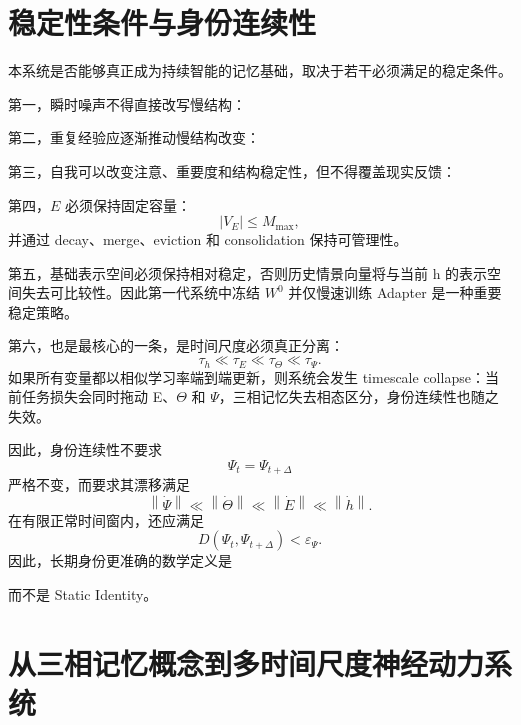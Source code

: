 \section{稳定性条件与身份连续性}

本系统是否能够真正成为持续智能的记忆基础，取决于若干必须满足的稳定条件。

第一，瞬时噪声不得直接改写慢结构：
\begin{statementbox}
\centering
{}
\end{statementbox}

第二，重复经验应逐渐推动慢结构改变：
\begin{statementbox}
\centering
{}
\end{statementbox}

第三，自我可以改变注意、重要度和结构稳定性，但不得覆盖现实反馈：
\begin{statementbox}
\centering
{}
\end{statementbox}

第四，$E$ 必须保持固定容量：
\[
\boxed{
|V_E|
\leq
M_{\max},
}
\]
并通过 decay、merge、eviction 和 consolidation 保持可管理性。

第五，基础表示空间必须保持相对稳定，否则历史情景向量将与当前 h 的表示空间失去可比较性。因此第一代系统中冻结 $W^0$ 并仅慢速训练 Adapter 是一种重要稳定策略。

第六，也是最核心的一条，是时间尺度必须真正分离：
\[
\boxed{
\tau_h
\ll
\tau_E
\ll
\tau_\Theta
\ll
\tau_\Psi.
}
\]
如果所有变量都以相似学习率端到端更新，则系统会发生 timescale collapse：当前任务损失会同时拖动 E、$\Theta$ 和 $\Psi$，三相记忆失去相态区分，身份连续性也随之失效。

因此，身份连续性不要求
\[
\Psi_t
=
\Psi_{t+\Delta}
\]
严格不变，而要求其漂移满足
\[
\left\|
\dot\Psi
\right\|
\ll
\left\|
\dot\Theta
\right\|
\ll
\left\|
\dot E
\right\|
\ll
\left\|
\dot h
\right\|.
\]
在有限正常时间窗内，还应满足
\[
D
\left(
\Psi_t,\Psi_{t+\Delta}
\right)
<
\varepsilon_\Psi.
\]
因此，长期身份更准确的数学定义是
\begin{statementbox}
\centering
{}
\end{statementbox}
而不是 Static Identity。

\section{从三相记忆概念到多时间尺度神经动力系统}

